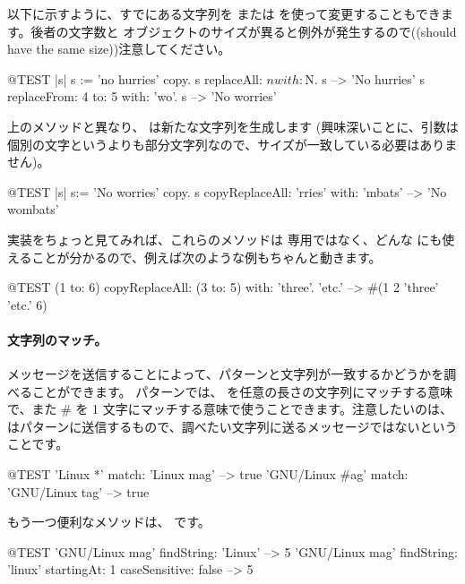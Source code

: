 \documentclass[a4paper,10pt,twoside]{book}
\begin{document}
以下に示すように、すでにある文字列を  または  を使って変更することもできます。後者の文字数と  オブジェクトのサイズが異ると例外が発生するので((should have the same size))注意してください。

\begin{code}{@TEST |s| s := 'no hurries' copy.}
s replaceAll: $n with: $N.
s --> 'No hurries'
s replaceFrom: 4 to: 5 with: 'wo'.
s --> 'No worries'
\end{code}

上のメソッドと異なり、 は新たな文字列を生成します
(興味深いことに、引数は個別の文字というよりも部分文字列なので、サイズが一致している必要はありません)。

\begin{code}{@TEST |s| s:= 'No worries' copy.}
s copyReplaceAll: 'rries' with: 'mbats' --> 'No wombats'
\end{code}

実装をちょっと見てみれば、これらのメソッドは  専用ではなく、どんな  にも使えることが分かるので、例えば次のような例もちゃんと動きます。

\begin{code}{@TEST}
(1 to: 6) copyReplaceAll: (3 to: 5) with: { 'three'. 'etc.' } --> #(1 2 'three' 'etc.' 6)
\end{code}

\paragraph{文字列のマッチ。}
 メッセージを送信することによって、パターンと文字列が一致するかどうかを調べることができます。
パターンでは、\ct{*} を任意の長さの文字列にマッチする意味で、また \# を 1 文字にマッチする意味で使うことできます。注意したいのは、 はパターンに送信するもので、調べたい文字列に送るメッセージではないということです。
\begin{code}{@TEST}
'Linux *' match: 'Linux mag'                      --> true
'GNU/Linux #ag' match: 'GNU/Linux tag' --> true
\end{code}

もう一つ便利なメソッドは、 です。
\begin{code}{@TEST}
'GNU/Linux mag' findString: 'Linux'                                                      --> 5
'GNU/Linux mag' findString: 'linux' startingAt: 1 caseSensitive: false  --> 5
\end{code}
\end{document}

